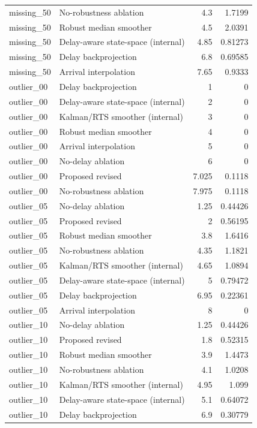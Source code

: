 \begin{table}[!htbp]
{\begin{tabular}{llrr}
missing_50 & No-robustness ablation & 4.3 & 1.7199 \\
missing_50 & Robust median smoother & 4.5 & 2.0391 \\
missing_50 & Delay-aware state-space (internal) & 4.85 & 0.81273 \\
missing_50 & Delay backprojection & 6.8 & 0.69585 \\
missing_50 & Arrival interpolation & 7.65 & 0.9333 \\
outlier_00 & Delay backprojection & 1 & 0 \\
outlier_00 & Delay-aware state-space (internal) & 2 & 0 \\
outlier_00 & Kalman/RTS smoother (internal) & 3 & 0 \\
outlier_00 & Robust median smoother & 4 & 0 \\
outlier_00 & Arrival interpolation & 5 & 0 \\
outlier_00 & No-delay ablation & 6 & 0 \\
outlier_00 & Proposed revised & 7.025 & 0.1118 \\
outlier_00 & No-robustness ablation & 7.975 & 0.1118 \\
outlier_05 & No-delay ablation & 1.25 & 0.44426 \\
outlier_05 & Proposed revised & 2 & 0.56195 \\
outlier_05 & Robust median smoother & 3.8 & 1.6416 \\
outlier_05 & No-robustness ablation & 4.35 & 1.1821 \\
outlier_05 & Kalman/RTS smoother (internal) & 4.65 & 1.0894 \\
outlier_05 & Delay-aware state-space (internal) & 5 & 0.79472 \\
outlier_05 & Delay backprojection & 6.95 & 0.22361 \\
outlier_05 & Arrival interpolation & 8 & 0 \\
outlier_10 & No-delay ablation & 1.25 & 0.44426 \\
outlier_10 & Proposed revised & 1.8 & 0.52315 \\
outlier_10 & Robust median smoother & 3.9 & 1.4473 \\
outlier_10 & No-robustness ablation & 4.1 & 1.0208 \\
outlier_10 & Kalman/RTS smoother (internal) & 4.95 & 1.099 \\
outlier_10 & Delay-aware state-space (internal) & 5.1 & 0.64072 \\
outlier_10 & Delay backprojection & 6.9 & 0.30779 \\

\end{tabular}}
\end{table}
